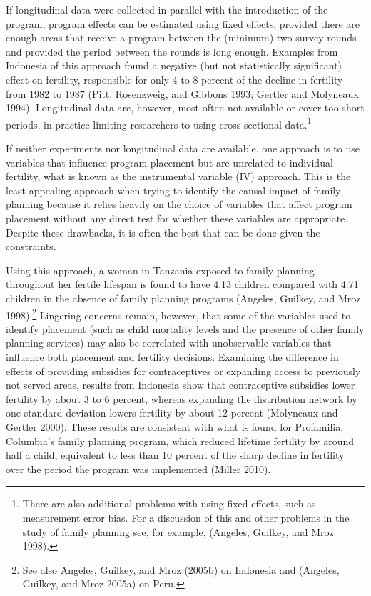 \documentclass[]{article}
\begin{document}
If longitudinal data were collected in parallel with the introduction of the program, program effects can be estimated using fixed effects, provided there are enough areas that receive a program between the (minimum) two survey rounds and provided the period between the rounds is long enough. Examples from Indonesia of this approach found a negative (but not statistically significant) effect on fertility, responsible for only 4 to 8 percent of the decline in fertility from 1982 to 1987 (Pitt, Rosenzweig, and Gibbons 1993; Gertler and Molyneaux 1994). Longitudinal data are, however, most often not available or cover too short periods, in practice limiting researchers to using cross-sectional data.\footnote{There are also additional problems with using fixed effects, such as measurement error bias. For a discussion of this and other problems in the study of family planning see, for example, (Angeles, Guilkey, and Mroz 1998).}

If neither experiments nor longitudinal data are available, one approach is to use variables that influence program placement but are unrelated to individual fertility, what is known as the instrumental variable (IV) approach. This is the least appealing approach when trying to identify the causal impact of family planning because it relies heavily on the choice of variables that affect program placement without any direct test for whether these variables are appropriate. Despite these drawbacks, it is often the best that can be done given the constraints.

Using this approach, a woman in Tanzania exposed to family planning throughout her fertile lifespan is found to have 4.13 children compared with 4.71 children in the absence of family planning programs (Angeles, Guilkey, and Mroz 1998).\footnote{See also Angeles, Guilkey, and Mroz (2005b) on Indonesia and (Angeles, Guilkey, and Mroz 2005a) on Peru.} Lingering concerns remain, however, that some of the variables used to identify placement (such as child mortality levels and the presence of other family planning services) may also be correlated with unobservable variables that influence both placement and fertility decisions. Examining the difference in effects of providing subsidies for contraceptives or expanding access to previously not served areas, results from Indonesia show that contraceptive subsidies lower fertility by about 3 to 6 percent, whereas expanding the distribution network by one standard deviation lowers fertility by about 12 percent (Molyneaux and Gertler 2000). These results are consistent with what is found for Profamilia, Columbia's family planning program, which reduced lifetime fertility by around half a child, equivalent to less than 10 percent of the sharp decline in fertility over the period the program was implemented (Miller 2010).
\end{document}
